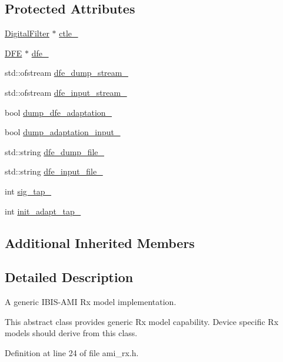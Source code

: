 \subsection*{Protected Attributes}
\begin{DoxyCompactItemize}
\item 
\hyperlink{class_digital_filter}{Digital\+Filter} $\ast$ \hyperlink{class_ami_rx_a64fc9d9aac458b2f6b398c2f7d9f7fb2}{ctle\+\_\+}
\item 
\hyperlink{class_d_f_e}{D\+F\+E} $\ast$ \hyperlink{class_ami_rx_a68a79c0882e2c3a5bf2850578481bc2b}{dfe\+\_\+}
\item 
std\+::ofstream \hyperlink{class_ami_rx_a7498677c54b51e987e00b5e692ecedaf}{dfe\+\_\+dump\+\_\+stream\+\_\+}
\item 
std\+::ofstream \hyperlink{class_ami_rx_a4032ef1f57bf4b5aef5cb481ea65622c}{dfe\+\_\+input\+\_\+stream\+\_\+}
\item 
bool \hyperlink{class_ami_rx_a985a6dc41e2c65429ad773a6c04a356b}{dump\+\_\+dfe\+\_\+adaptation\+\_\+}
\item 
bool \hyperlink{class_ami_rx_a2bda560b4aa1312dcd9654294b1d7e76}{dump\+\_\+adaptation\+\_\+input\+\_\+}
\item 
std\+::string \hyperlink{class_ami_rx_a3c8f710b6bdaedb0c35918aac0d99038}{dfe\+\_\+dump\+\_\+file\+\_\+}
\item 
std\+::string \hyperlink{class_ami_rx_a57786bfc4be423b3cfccc03081b6bb50}{dfe\+\_\+input\+\_\+file\+\_\+}
\item 
int \hyperlink{class_ami_rx_a93343b91ac17149bce7ef0a971512507}{sig\+\_\+tap\+\_\+}
\item 
int \hyperlink{class_ami_rx_a20d036e33d3690b8274fb5e338ce4d53}{init\+\_\+adapt\+\_\+tap\+\_\+}
\end{DoxyCompactItemize}
\subsection*{Additional Inherited Members}


\subsection{Detailed Description}
A generic I\+B\+I\+S-\/\+A\+M\+I Rx model implementation. 

This abstract class provides generic Rx model capability. Device specific Rx models should derive from this class. 

Definition at line 24 of file ami\+\_\+rx.\+h.



